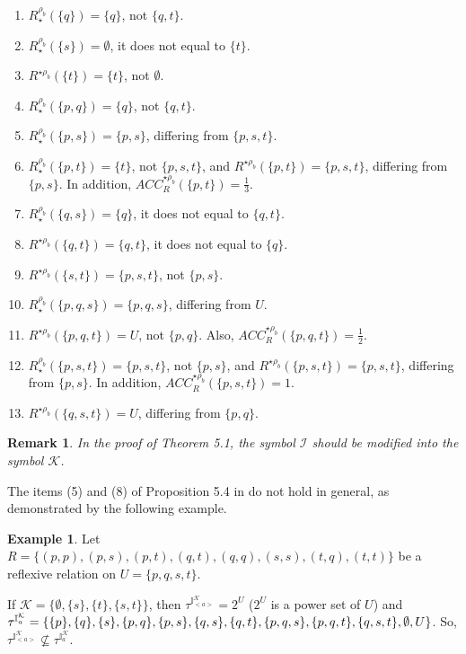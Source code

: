 \documentclass{article}
\theoremstyle{theorem}
\newtheorem{remark}{Remark}[section]
\theoremstyle{definition}
\newtheorem{example}{Example}[section]
\theoremstyle{remark}
\begin{document}
\begin{enumerate}
 \item  $R_{\star}^{\rho_{b}}(\{q\})=\{q\}$, not $\{q, t\}$.
  \item  $R_{\star}^{\rho_{b}}(\{s\})=\emptyset$, it does not equal to $\{t\}$.
  \item $R^{\star \rho_{b}}(\{t\})=\{t\}$, not $\emptyset$.
 \item  $R_{\star}^{\rho_{b}}(\{p, q\})=\{q\}$, not $\{q, t\}$.
\item  $R_{\star}^{\rho_{b}}(\{p, s\})=\{p, s\}$, differing from $\{p, s, t\}$.
\item  $R_{\star}^{\rho_{b}}(\{p, t\})=\{t\}$, not $\{p, s, t\}$, and $R^{\star \rho_{b}}(\{p, t\})=\{p, s, t\}$, differing from $\{p, s\}$. In addition, $ACC_{R}^{\star \rho_{b}}(\{p, t\})= \frac{1}{3}$.
 \item  $R_{\star}^{\rho_{b}}(\{q, s\})=\{q\}$, it does not equal to $\{q, t\}$.
 \item $R^{\star \rho_{b}}(\{q, t\})=\{q, t\}$, it does not equal to $\{q\}$.
  \item $R^{\star \rho_{b}}(\{s, t\})=\{p, s, t\}$, not $\{p, s\}$.
 \item  $R_{\star}^{\rho_{b}}(\{p, q, s\})=\{p, q, s\}$, differing from $U$.
\item $R^{\star \rho_{b}}(\{p, q, t\})=U$, not $\{p, q\}$. Also, $ACC_{R}^{\star \rho_{b}}(\{p, q, t\})= \frac{1}{2}$.
\item  $R_{\star}^{\rho_{b}}(\{p, s, t\})=\{p, s, t\}$, not $\{p, s\}$, and $R^{\star \rho_{b}}(\{p, s, t\})=\{p, s, t\}$, differing from $\{p, s\}$. In addition, $ACC_{R}^{\star \rho_{b}}(\{p, s, t\})= 1$.
 \item $R^{\star \rho_{b}}(\{q, s, t\})=U$, differing from  $\{p, q\}$.
 \color{black}
\end{enumerate}

\begin{remark} In the proof of Theorem 5.1, the symbol $\mathcal{I}$ should be modified into the symbol $\mathcal{K}$.
\end{remark}

The items (5) and (8) of Proposition 5.4 in \cite{Al-shami 2024} do not hold in general, as demonstrated by the following example.

\begin{example}\label{e3} Let $R = \{(p, p), (p, s), (p, t), (q, t), (q, q), (s, s), (t, q), (t, t)\}$ be a reflexive relation on $U=\{p, q, s, t\}$.

    If $\mathcal{K} = \{\emptyset, \{s\}, \{t\}, \{s, t\}\}$, then $\tau^{{\mathbb{I}_{<a>}^{\mathcal{K}}}} =  2^{U}$ ($2^{U}$ is a power set of $U$) and $\tau^{{\mathbb{I}_{a}^{\mathcal{K}}}} = \{\{p\}, \{q\}, \{s\}, \{p, q\}, \{p, \\
     s\}, \{q, s\}, \{q, t\}, \{p, q, s\}, \{p, q, t\}, \{q, s, t\}, \emptyset, U\}$.
\color{black}
So, $\tau^{{\mathbb{I}_{<a>}^{\mathcal{K}}}}\nsubseteq \tau^{{\mathbb{I}_{a}^{\mathcal{K}}}}$.
\end{example}
\end{document}
